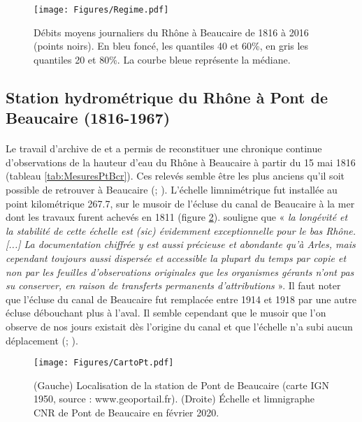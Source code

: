 \documentclass[11pt]{article}
\begin{document}
	\begin{figure}[h!]
	\centering
		\texttt{[image: Figures/Regime.pdf]}
        \caption{Débits moyens journaliers du Rhône à Beaucaire de 1816 à 2016 (points noirs). En bleu foncé, les quantiles 40 et 60\%, en gris les quantiles 20 et 80\%. La courbe bleue représente la médiane.}	
		\label{fig:Regime}
	\end{figure}


	
\FloatBarrier

	\subsection{Station hydrométrique du Rhône à Pont de Beaucaire (1816-1967)}
		
	\paragraph{} Le travail d'archive de \citet{pichard_les_1995} et \citet{pichard_hydro-climatology_2017} a permis de reconstituer une chronique continue d'observations de la hauteur d'eau du Rhône à Beaucaire à partir du 15 mai 1816 (tableau \ref{tab:MesuresPtBcr}). Ces relevés semble être les plus anciens qu'il soit possible de retrouver à Beaucaire (\cite{parde_regime_1925}; \cite{pichard_les_1995}). L'échelle limnimétrique fut installée au point kilométrique 267.7, sur le musoir de l'écluse du canal de Beaucaire à la mer dont les travaux furent achevés en 1811 (figure \ref{fig:CartoPt}). \citet{pichard_hauteurs_2013} souligne que « \textit{la longévité et la stabilité de cette échelle est (sic) évidemment exceptionnelle pour le bas Rhône. [...] La documentation chiffrée y est aussi précieuse et abondante qu'à Arles, mais cependant toujours aussi dispersée et accessible la plupart du temps par copie et non par les feuilles d'observations originales que les organismes gérants n'ont pas su conserver, en raison de transferts permanents d'attributions} ». Il faut noter que l'écluse du canal de Beaucaire fut remplacée entre 1914 et 1918 par une autre écluse débouchant plus à l'aval. Il semble cependant que le musoir que l'on observe de nos jours existait dès l'origine du canal et que l'échelle n'a subi aucun déplacement (\cite{pichard_hauteurs_2013}; \cite{bard_actualisation_2018}). 
	
	\begin{figure}[h]
	\centering
		\texttt{[image: Figures/CartoPt.pdf]}
        \caption{(Gauche) Localisation de la station de Pont de Beaucaire (carte IGN 1950, source : www.geoportail.fr). (Droite) Échelle et limnigraphe CNR de Pont de Beaucaire en février 2020.}	
		\label{fig:CartoPt}
	\end{figure}
\end{document}
